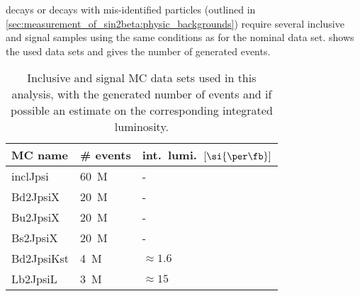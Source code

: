 decays or decays with mis-identified particles (outlined in
\cref{sec:measurement_of_sin2beta:physic_backgrounds}) require several inclusive
and signal \MC samples using the same conditions as for the nominal \MC data
set. 
shows the used \MC data sets and gives the number of generated events.
%
\begin{table}[!htb]
\centering
\caption{Inclusive and signal MC data sets used in this analysis, with the
generated number of events and if possible an estimate on the corresponding
integrated luminosity.}
\label{tab:measurement_of_sin2beta:data_preparation:datasamples:mc:samples}
\begin{tabular}{lll}
\toprule
\acs{MC} name & \# events & int.\ lumi.\ $[\si{\per\fb}]$ \\ 
\midrule
inclJpsi    & \SI{60}{M} & -             \\
Bd2JpsiX    & \SI{20}{M} & -             \\
Bu2JpsiX    & \SI{20}{M} & -             \\
Bs2JpsiX    & \SI{20}{M} & -             \\
Bd2JpsiKst  & \SI{4}{M}  & $\approx 1.6$ \\
Lb2JpsiL    & \SI{3}{M}  & $\approx 15$  \\
\bottomrule
\end{tabular}
\end{table}
